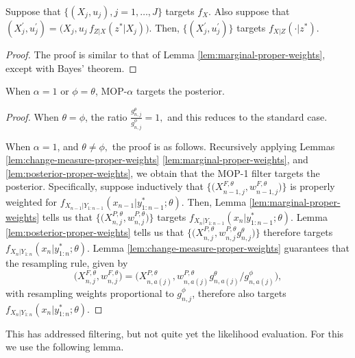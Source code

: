\documentclass{article}
\begin{document}
\begin{lem}
    \label{lem:posterior-proper-weights}
    Suppose that $\{(X_j,u_j),j=1,\dots,J\}$ targets $f_X$. Also suppose that $(X^\prime_j,u^\prime_j) = \big(X_j,u_j\, f_{Z|X}(z^*|X_j)\big)$. Then, $\{(X^\prime_j,u^\prime_j)\}$ targets $f_{X|Z}(\cdot | z^*)$.
\end{lem}

\begin{proof}
    The proof is similar to that of Lemma \ref{lem:marginal-proper-weights}, except with Bayes' theorem. 
\end{proof}


\begin{prop}
    When $\alpha=1$ or $\phi=\theta$, MOP-$\alpha$ targets the posterior. 
\end{prop}
\begin{proof}
    When $\theta=\phi$, the ratio $\frac{g_{n,j}^\theta}{g_{n,j}^\phi}=1,$ and this reduces to the standard case.

    When $\alpha=1$, and $\theta\neq\phi,$ the proof is as follows. Recursively applying Lemmas \ref{lem:change-measure-proper-weights} \ref{lem:marginal-proper-weights}, and \ref{lem:posterior-proper-weights}, we obtain that 
    the MOP-1 filter targets the posterior.
    Specifically, suppose inductively that $\big\{\big(X^{F,\theta}_{n-1,j},w^{F,\theta}_{n-1,j}\big)\big\}$ is properly weighted for $f_{X_{n-1}|Y_{1:n-1}}(x_{n-1}|y^*_{1:n-1};\theta)$.
    Then, Lemma \ref{lem:marginal-proper-weights} tells us that $\big\{\big(X^{P,\theta}_{n,j},w^{P,\theta}_{n,j}\big)\big\}$ targets $f_{X_{n}|Y_{1:n-1}}(x_{n}|y^*_{1:n-1};\theta)$.
    Lemma \ref{lem:posterior-proper-weights} tells us that $\big\{\big(X^{P,\theta}_{n,j},w^{P,\theta}_{n,j} g^\theta_{n,j} \big)\big\}$ therefore targets  $f_{X_{n}|Y_{1:n}}(x_{n}|y^*_{1:n};\theta)$.
    Lemma \ref{lem:change-measure-proper-weights} guarantees that the resampling rule, given by 
    \[
    \big(X^{F,\theta}_{n,j},w^{F,\theta}_{n,j}\big) = \big(X^{P,\theta}_{n,a(j)}, w^{P,\theta}_{n,a(j)} g^\theta_{n,a(j)}\big/ g^\phi_{n,a(j)}\big),
    \]
    with resampling weights proportional to $g^\phi_{n,j}$, therefore also targets $f_{X_{n}|Y_{1:n}}(x_{n}|y^*_{1:n};\theta)$.
\end{proof}


This has addressed filtering, but not quite yet the likelihood evaluation. For this we use the following lemma.
\end{document}
